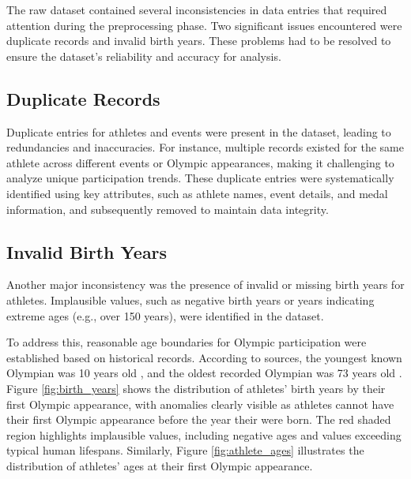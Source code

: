 The raw dataset contained several inconsistencies in data entries that required attention during the preprocessing phase. Two significant issues encountered were duplicate records and invalid birth years. These problems had to be resolved to ensure the dataset's reliability and accuracy for analysis.

\subsection{Duplicate Records}

Duplicate entries for athletes and events were present in the dataset, leading to redundancies and inaccuracies. For instance, multiple records existed for the same athlete across different events or Olympic appearances, making it challenging to analyze unique participation trends. These duplicate entries were systematically identified using key attributes, such as athlete names, event details, and medal information, and subsequently removed to maintain data integrity.

\subsection{Invalid Birth Years}

Another major inconsistency was the presence of invalid or missing birth years for athletes. Implausible values, such as negative birth years or years indicating extreme ages (e.g., over 150 years), were identified in the dataset. %

To address this, reasonable age boundaries for Olympic participation were established based on historical records. According to sources, the youngest known Olympian was 10 years old \cite{youngest_olympian}, and the oldest recorded Olympian was 73 years old \cite{oldest_olympian}.
Figure \ref{fig:birth_years} shows the distribution of athletes' birth years by their first Olympic appearance, with anomalies clearly visible as athletes cannot have their first Olympic appearance before the year their were born. The red shaded region highlights implausible values, including negative ages and values exceeding typical human lifespans. Similarly, Figure \ref{fig:athlete_ages} illustrates the distribution of athletes' ages at their first Olympic appearance.

